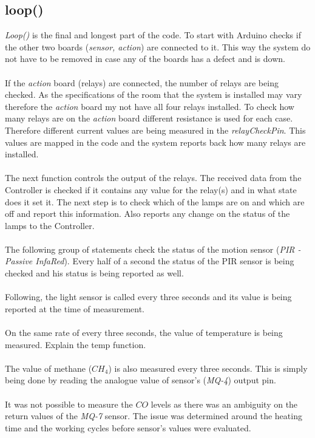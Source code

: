 \documentclass[12pt,a4paper]{report}
\begin{document}
\subsection{loop()}
\textit{Loop()} is the final and longest part of the code. To start with Arduino checks if the other two boards (\textit{sensor, action}) are connected to it. This way the system do not have to be removed in case any of the boards has a defect and is down.\\
\ \\
If the \textit{action} board (relays) are connected, the number of relays are being checked. As the specifications of the room that the system is installed may vary therefore the \textit{action} board my not have all four relays installed. To check how many relays are on the \textit{action} board different resistance is used for each case. Therefore different current values are being measured in the \textit{relayCheckPin}. This values are mapped in the code and the system reports back how many relays are installed.\\
\ \\
The next function controls the output of the relays. The received data from the Controller is checked if it contains any value for the relay(s) and in what state does it set it. The next step is to check which of the lamps are on and which are off and report this information. Also reports any change on the status of the lamps to the Controller. \\
\ \\
The following group of statements check the status of the motion sensor (\textit{PIR - Passive InfaRed}). Every half of a second the status of the PIR sensor is being checked and his status is being reported as well.\\
\ \\
Following, the light sensor is called every three seconds and its value is being reported at the time of measurement.\\
\ \\
On the same rate of every three seconds, the value of temperature is being measured. Explain the temp function. \\
\ \\
The value of methane ($CH_4$) is also measured every three seconds. This is simply being done by reading the analogue value of sensor's (\textit{MQ-4}) output pin.\\
\ \\
It was not possible to measure the $CO$ levels as there was an ambiguity on the return values of the \textit{MQ-7} sensor. The issue was determined around the heating time and the working cycles before sensor's values were evaluated.\\
\ \\
%
\end{document}
